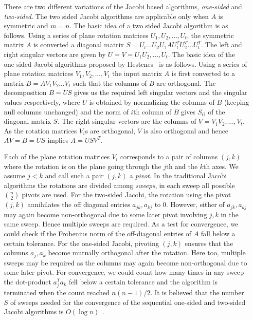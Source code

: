 \documentclass[10pt, conference, compsocconf]{IEEEtran}
\begin{document}
There are two different variations of the Jacobi based algorithms, \emph{one-sided} and \emph{two-sided}. The two sided Jacobi algorithms are applicable only when $A$ is symmetric and $m=n$. The basic idea of a two sided Jacobi algorithm is as follows. Using a series of plane rotation matrices $U_1, U_2, \ldots, U_t$, the symmetric matrix $A$ is converted a diagonal matrix $S = U_t \ldots U_2 U_1 A U^T_1 U^T_2 \ldots U^T_t$. The left and right singular vectors are given by $U=V=U_1U_2,\ldots,U_t$. The basic idea of the one-sided Jacobi algorithms proposed by Hestenes~\cite{hestenes1958inversion} is as follows. Using a series of plane rotation matrices $V_1, V_2, \ldots, V_t$ the input matrix $A$ is first converted to a matrix $B=AV_1V_2\ldots V_t$ such that the columns of $B$ are orthogonal. The decomposition $B = US$ gives us the required left singular vectors and the singular values respectively, where $U$ is obtained by normalizing the columns of $B$ (keeping null columns unchanged) and the norm of $i$th column of $B$ gives $S_{ii}$ of the diagonal matrix $S$. The right singular vectors are the columns of $V=V_1V_2,\ldots,V_t$. As the rotation matrices $V_i$s are orthogonal, $V$ is also orthogonal and hence $AV = B = US$ implies $A = USV^T$.

Each of the plane rotation matrices $V_i$ corresponds to a pair of columns $(j,k)$ where the rotation is on the plane going through the $j$th and the $k$th axes. We assume $j<k$ and call such a pair $(j,k)$ a \emph{pivot}.  In the traditional Jacobi algorithms the rotations are divided among \emph{sweeps}, in each sweep all possible ${n \choose 2}$ pivots are used. For the two-sided Jacobi, the rotation using the pivot $(j,k)$ annihilates the off diagonal entries $a_{jk}, a_{kj}$ to $0$. However, either of $a_{jk}, a_{kj}$ may again become non-orthogonal due to some later pivot involving $j,k$ in the same sweep. Hence multiple sweeps are required. As a test for convergence, we could check if the Frobenius norm of the off-diagonal entries of $A$ fall below a certain tolerance. For the one-sided Jacobi, pivoting $(j,k)$ ensures that the columns $a_j,a_k$ become mutually orthogonal after the rotation. Here too, multiple sweeps may be required as the columns may again become non-orthogonal due to some later pivot. For convergence, we could count how many times in any sweep the dot-product $a_j^{T}a_k$ fell below a certain tolerance and the algorithm is terminated when the count reached $n(n-1)/2$. It is believed that the number $S$ of sweeps needed for the convergence of the sequential one-sided and two-sided Jacobi algorithms is $O(\log n)$~\cite{golub2012matrix}.  
\end{document}
